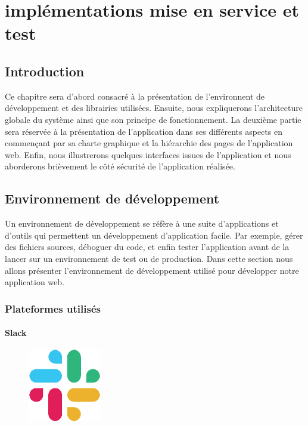 \chapter{implémentations mise en service et test}
\renewcommand{\headrulewidth}{1pt}

\section{Introduction}
Ce chapitre sera d'abord consacré à la présentation de l’environnent de
développement et des librairies utilisées. Ensuite, nous expliquerons
l’architecture globale du système ainsi que son principe de fonctionnement. La
deuxième partie sera réservée à la présentation de l’application dans ses
différents aspects en commençant par sa charte graphique et la hiérarchie des
pages de l’application web. Enfin, nous illustrerons quelques interfaces issues
de l’application et nous aborderons brièvement le côté sécurité de l’application
réalisée.   

\section{Environnement de développement}
Un environnement de développement se réfère à une suite d’applications et 
d’outils qui permettent un développement d’application facile. Par exemple, 
gérer des fichiers sources, déboguer du code, et enfin tester l’application 
avant de la lancer sur un environnement de test ou de production. Dans cette 
section nous allons présenter l’environnement de développement utilisé pour 
développer notre application web.

\subsection{Plateformes utilisés}

\subsubsection*{Slack}
\begin{figure}
    \vspace{-22pt}
    \begin{center}
        \includegraphics[scale=0.36]{images/logo/slack.png}
        \label{fig62}
    \end{center}
    \vspace{-20pt}
    \vspace{-10pt}
\end{figure}

